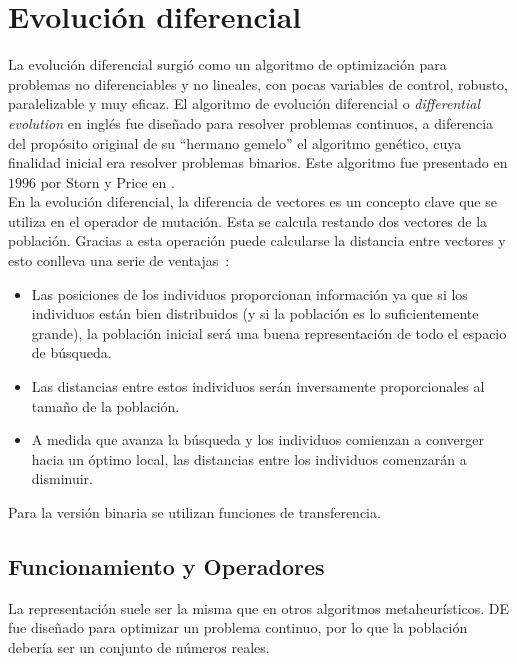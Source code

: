 \section{Evolución diferencial}
La evolución diferencial surgió como un algoritmo de optimización para problemas no diferenciables y no lineales, con pocas variables de control, robusto, paralelizable y muy eficaz. El algoritmo de evolución diferencial o \textit{differential evolution} en inglés fue diseñado para resolver problemas continuos, a diferencia del propósito original de su ``hermano gemelo'' el algoritmo genético, cuya finalidad inicial era resolver problemas binarios. Este algoritmo fue presentado en $1996$ por Storn y Price en \cite{storn_differential_1997}.\\[6pt]
En la evolución diferencial, la diferencia de vectores es un concepto clave que se utiliza en el operador de mutación. Esta se calcula restando dos vectores de la población. Gracias a esta operación puede calcularse la distancia entre vectores y esto conlleva una serie de ventajas~\cite{storn_differential_1997}:
\begin{itemize}
    \item Las posiciones de los individuos proporcionan información ya que si los individuos están bien distribuidos (y si la población es lo suficientemente grande), la población inicial será una buena representación de todo el espacio de búsqueda.
    \item Las distancias entre estos individuos serán inversamente proporcionales al tamaño de la población.
    \item A medida que avanza la búsqueda y los individuos comienzan a converger hacia un óptimo local, las distancias entre los individuos comenzarán a disminuir.
\end{itemize}
Para la versión binaria se utilizan funciones de transferencia.

\subsection{Funcionamiento y Operadores}
La representación suele ser la misma que en otros algoritmos metaheurísticos. DE fue diseñado para optimizar un problema continuo, por lo que la población debería ser un conjunto de números reales.


